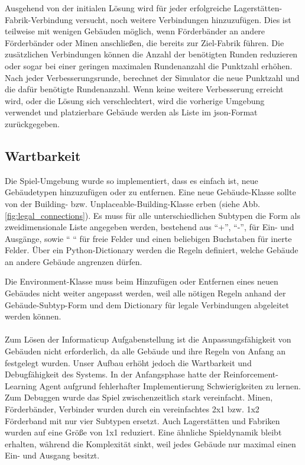 Ausgehend von der initialen Lösung wird für jeder erfolgreiche Lagerstätten-Fabrik-Verbindung versucht, noch weitere Verbindungen hinzuzufügen. Dies ist teilweise mit wenigen Gebäuden möglich, wenn Förderbänder an andere Förderbänder oder Minen anschließen, die bereits zur Ziel-Fabrik führen. Die zusätzlichen Verbindungen können die Anzahl der benötigten Runden reduzieren oder sogar bei einer geringen maximalen Rundenanzahl die Punktzahl erhöhen. 
Nach jeder Verbesserungsrunde, berechnet der Simulator die neue Punktzahl und die dafür benötigte Rundenanzahl. Wenn keine weitere Verbesserung erreicht wird, oder die Lösung sich verschlechtert, wird die vorherige Umgebung verwendet und platzierbare Gebäude werden als Liste im json-Format zurückgegeben.

\subsection{Wartbarkeit}
Die Spiel-Umgebung wurde so implementiert, dass es einfach ist, neue Gebäudetypen hinzuzufügen oder zu entfernen. Eine neue Gebäude-Klasse sollte von der Building- bzw. Unplaceable-Building-Klasse erben (siehe Abb. \ref{fig:legal_connections}). Es muss für alle unterschiedlichen Subtypen die Form als zweidimensionale Liste angegeben werden, bestehend aus “+”, “-”, für Ein- und Ausgänge, sowie “ “ für freie Felder und einen beliebigen Buchstaben für inerte Felder. 
Über ein Python-Dictionary werden die Regeln definiert, welche Gebäude an andere Gebäude angrenzen dürfen. 

Die Environment-Klasse muss beim Hinzufügen oder Entfernen eines neuen Gebäudes nicht weiter angepasst werden, weil alle nötigen Regeln anhand der Gebäude-Subtyp-Form und dem Dictionary für legale Verbindungen abgeleitet werden können.
\\\\
Zum Lösen der Informaticup Aufgabenstellung ist die Anpassungsfähigkeit von Gebäuden nicht erforderlich, da alle Gebäude und ihre Regeln von Anfang an festgelegt wurden. Unser Aufbau erhöht jedoch die Wartbarkeit und Debugfähigkeit des Systems. 
In der Anfangsphase hatte der Reinforcement-Learning Agent aufgrund fehlerhafter Implementierung Schwierigkeiten zu lernen. Zum Debuggen wurde das Spiel zwischenzeitlich stark vereinfacht. Minen, Förderbänder, Verbinder wurden durch ein vereinfachtes 2x1 bzw. 1x2 Förderband mit nur vier Subtypen ersetzt. Auch Lagerstätten und Fabriken wurden auf eine Größe von 1x1 reduziert. Eine ähnliche Spieldynamik bleibt erhalten, während die Komplexität sinkt, weil jedes Gebäude nur maximal einen Ein- und Ausgang besitzt. 




